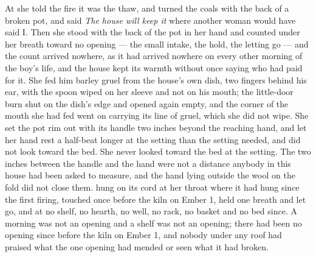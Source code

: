 At  she told the fire it was the thaw, and turned the coals with the back of a broken pot, and said \emph{The house will keep it} where another woman would have said I. Then she stood with the back of the pot in her hand and counted under her breath toward no opening --- the small intake, the hold, the letting go --- and the count arrived nowhere, as it had arrived nowhere on every other morning of the boy's life, and the house kept its warmth without once saying who had paid for it. She fed him barley gruel from the house's own dish, two fingers behind his ear, with the spoon wiped on her sleeve and not on his mouth; the little-door burn shut on the dish's edge and opened again empty, and the corner of the mouth she had fed went on carrying its line of gruel, which she did not wipe. She set the pot rim out with its handle two inches beyond the reaching hand, and let her hand rest a half-beat longer at the setting than the setting needed, and did not look toward the bed. She never looked toward the bed at the setting. The two inches between the handle and the hand were not a distance anybody in this house had been asked to measure, and the hand lying outside the wool on the fold did not close them.  hung on its cord at her throat where it had hung since the first firing, touched once before the kiln on Ember 1, held one breath and let go, and at no shelf, no hearth, no well, no rack, no basket and no bed since. A morning was not an opening and a shelf was not an opening; there had been no opening since before the kiln on Ember 1, and nobody under any roof had praised what the one opening had mended or seen what it had broken.

\scenebreak

